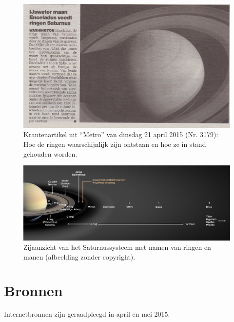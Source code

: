 \documentclass[a4paper]{article}
\begin{document}
	\begin{figure}[!h]
			\centering
			\includegraphics[scale=0.72]{img/Krantensnipsel.jpg}
			\caption{Krantenartikel uit ``Metro'' van dinsdag 21 april 2015 (Nr. 3179): Hoe de ringen waarschijnlijk zijn ontstaan en hoe ze in stand gehouden worden.}
			\label{fig:Krantensnipsel}
	\end{figure}
	\begin{figure}[!p]
			\centering
			\includegraphics[scale=0.21, angle=90]{img/SaturnusGelabeled.jpg}
			\caption{Zijaanzicht van het Saturnussysteem met namen van ringen en manen (afbeelding zonder copyright).}
			\label{fig:SaturnusGelabeled}
	\end{figure}
	
	\newpage
\section{Bronnen}	
Internetbronnen zijn geraadpleegd in april en mei 2015.\\
\end{document}
